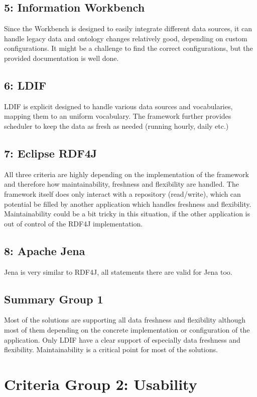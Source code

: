 \subsection*{5: Information Workbench}
Since the Workbench is designed to easily integrate different data sources, it can 
handle legacy data and ontology changes relatively good, depending on custom 
configurations. It might be a challenge to find the correct configurations, but 
the provided documentation is well done.

\subsection*{6: LDIF}
LDIF is explicit designed to handle various data sources and vocabularies, mapping 
them to an uniform vocabulary. The framework further provides scheduler to keep 
the data as fresh as needed (running hourly, daily etc.)

\subsection*{7: Eclipse RDF4J}
All three criteria are highly depending on the implementation of the framework and 
therefore how maintainability, freshness and flexibility are handled. The 
framework itself does only interact with a repository (read/write), which can 
potential be filled by another application which handles freshness and 
flexibility. Maintainability could be a bit tricky in this situation, if the other 
application is out of control of the RDF4J implementation.

\subsection*{8: Apache Jena}
Jena is very similar to RDF4J, all statements there are valid for Jena too.

\subsection{Summary Group 1}
Most of the solutions are supporting all data freshness and flexibility although 
most of them depending on the concrete implementation or configuration of the 
application. Only LDIF have a clear support of especially data freshness and 
flexibility. Maintainability is a critical point for most of the solutions.

\section{Criteria Group 2: Usability}

